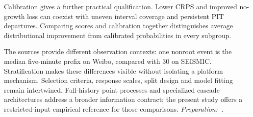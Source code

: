 Calibration gives a further practical qualification. Lower CRPS and improved no-growth loss can coexist with uneven interval coverage and persistent PIT departures. Comparing scores and calibration together distinguishes average distributional improvement from calibrated probabilities in every subgroup.

The sources provide different observation contexts: one nonroot event is the median five-minute prefix on Weibo, compared with 30 on SEISMIC. Stratification makes these differences visible without isolating a platform mechanism. Selection criteria, response scales, split design and model fitting remain intertwined. Full-history point processes and specialized cascade architectures address a broader information contract; the present study offers a restricted-input empirical reference for those comparisons. {\small\textit{Preparation:~\cite{openai2026}.}}
